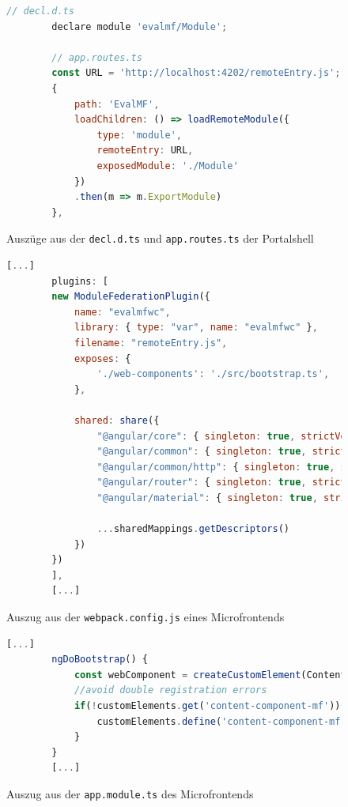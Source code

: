 \newpage
\begin{figure}[bht]
	\begin{lstlisting}[caption=Einbindung eines Module Federation Microfrontend, label=lst:MFPSConfig2, language=Javascript]
		// decl.d.ts
		declare module 'evalmf/Module';
		
		// app.routes.ts
		const URL = 'http://localhost:4202/remoteEntry.js';
		{
			path: 'EvalMF',
			loadChildren: () => loadRemoteModule({
				type: 'module',
				remoteEntry: URL,
				exposedModule: './Module'
			})
			.then(m => m.ExportModule) 
		},
	\end{lstlisting}
	\footnoterule{}
	\footnotesize{Auszüge aus der \texttt{decl.d.ts} und \texttt{app.routes.ts} der Portalshell}
\end{figure}

\newpage
\begin{figure}[bht]
	\begin{lstlisting}[caption=Konfiguration von Module Federation mit Web Components, label=lst:WebpackConfigMFWC, language=Javascript]
		[...]	
		plugins: [
		new ModuleFederationPlugin({
			name: "evalmfwc",
			library: { type: "var", name: "evalmfwc" },
			filename: "remoteEntry.js",
			exposes: {
				'./web-components': './src/bootstrap.ts',
			},        
			
			shared: share({
				"@angular/core": { singleton: true, strictVersion: true,requiredVersion: 'auto' }, 
				"@angular/common": { singleton: true, strictVersion: true, requiredVersion: 'auto' }, 
				"@angular/common/http": { singleton: true, strictVersion: true, requiredVersion: 'auto' }, 
				"@angular/router": { singleton: true, strictVersion: true, requiredVersion: 'auto' },
				"@angular/material": { singleton: true, strictVersion: true, requiredVersion: 'auto' },
				
				...sharedMappings.getDescriptors()
			})
		})
		],
		[...]
	\end{lstlisting}
	\footnoterule{}
	\footnotesize{Auszug aus der \texttt{webpack.config.js} eines Microfrontends}
\end{figure}

\newpage
\begin{figure}[bht]
	\begin{lstlisting}[caption=Definition des customElements zur Einbindung als Web Component, label=lst:MFWCAppModule, language=Javascript]
		[...]
		ngDoBootstrap() {
			const webComponent = createCustomElement(ContentComponent, {injector: this.injector});
			//avoid double registration errors
			if(!customElements.get('content-component-mf')){
				customElements.define('content-component-mf', webComponent);
			}
		}
		[...]
	\end{lstlisting}
	\footnoterule{}
	\footnotesize{Auszug aus der \texttt{app.module.ts} des Microfrontends}
\end{figure}

